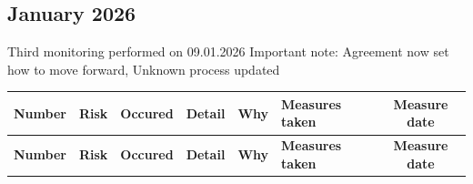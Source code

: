 \begin{landscape}
\subsection*{January 2026 }
Third monitoring performed on 09.01.2026
Important note: Agreement now set how to move forward, Unknown process updated

\begin{longtable}{|c|p{4cm}|c|p{3cm}|p{3cm}|p{3cm}|c|}
\hline
\textbf{Number} & \textbf{Risk} & \textbf{Occured} & \textbf{Detail} & \textbf{Why} & \textbf{Measures taken} & \textbf{Measure date} \\ \hline
\endfirsthead

\hline
\textbf{Number} & \textbf{Risk} & \textbf{Occured} & \textbf{Detail} & \textbf{Why} & \textbf{Measures taken} & \textbf{Measure date} \\ \hline
\endhead


\end{longtable}
\end{landscape}
